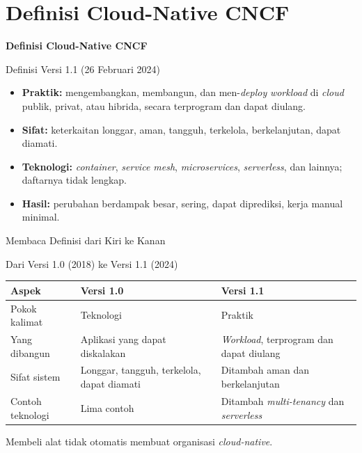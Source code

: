 \documentclass[aspectratio=169, table, 12pt]{beamer}
\begin{document}
\section{Definisi Cloud-Native CNCF}

\begin{frame}{\hfill}
  \centering
  \Huge{\textbf{Definisi Cloud-Native CNCF}}
\end{frame}

\begin{frame}{{\Large Definisi Versi 1.1 (26 Februari 2024)}}
  \vspace{6pt}
  \begin{itemize}
    \item \textbf{Praktik:} mengembangkan, membangun, dan men-\textit{deploy}
          \textit{workload} di \textit{cloud} publik, privat, atau hibrida, secara
          terprogram dan dapat diulang.
    \item \textbf{Sifat:} keterkaitan longgar, aman, tangguh, terkelola,
          berkelanjutan, dapat diamati.
    \item \textbf{Teknologi:} \textit{container}, \textit{service mesh},
          \textit{microservices}, \textit{serverless}, dan lainnya; daftarnya tidak
          lengkap.
    \item \textbf{Hasil:} perubahan berdampak besar, sering, dapat diprediksi,
          kerja manual minimal.
  \end{itemize}
\end{frame}

\begin{frame}{{\Large Membaca Definisi dari Kiri ke Kanan}}
  \centering
\end{frame}

\begin{frame}{{\Large Dari Versi 1.0 (2018) ke Versi 1.1 (2024)}}
  \vspace{4pt}
  \footnotesize
  \begin{tabularx}{\textwidth}{|p{2.6cm}|Y|Y|}
    \hline
    \textbf{Aspek} & \textbf{Versi 1.0} & \textbf{Versi 1.1} \\
    \hline
    Pokok kalimat & Teknologi & Praktik \\
    \hline
    Yang dibangun & Aplikasi yang dapat diskalakan & \textit{Workload}, terprogram
      dan dapat diulang \\
    \hline
    Sifat sistem & Longgar, tangguh, terkelola, dapat diamati & Ditambah aman dan
      berkelanjutan \\
    \hline
    Contoh teknologi & Lima contoh & Ditambah \textit{multi-tenancy} dan
      \textit{serverless} \\
    \hline
  \end{tabularx}

  \vspace{8pt}
  \small Membeli alat tidak otomatis membuat organisasi \textit{cloud-native}.
\end{frame}
\end{document}
